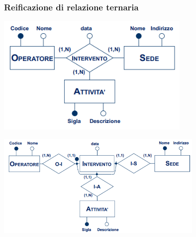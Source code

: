 \documentclass[12pt]{article}
\begin{document}
\subsubsection{Reificazione di relazione ternaria}
\begin{center}
    \includegraphics[width = 0.70\textwidth]{Images/55.PNG}
\end{center}
\begin{center}
    \includegraphics[width = 0.75\textwidth]{Images/56.PNG}
\end{center}
\end{document}
